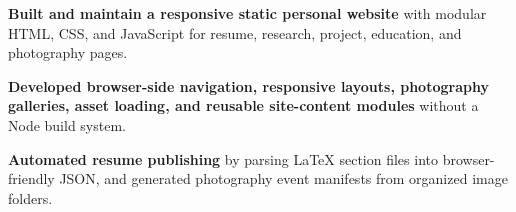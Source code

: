 \begin{bullets}
    \item \textbf{Built and maintain a responsive static personal website} with modular HTML, CSS, and JavaScript for resume, research, project, education, and photography pages.
    \item \textbf{Developed browser-side navigation, responsive layouts, photography galleries, asset loading, and reusable site-content modules} without a Node build system.
    \item \textbf{Automated resume publishing} by parsing LaTeX section files into browser-friendly JSON, and generated photography event manifests from organized image folders.
\end{bullets}